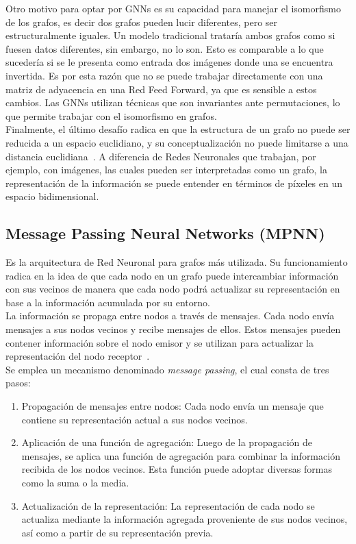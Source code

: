 Otro motivo para optar por GNNs es su capacidad para manejar el isomorfismo de los grafos, es decir dos grafos pueden lucir diferentes, pero ser estructuralmente iguales. Un modelo tradicional trataría ambos grafos como si fuesen datos diferentes, sin embargo, no lo son. Esto es comparable a lo que sucedería si se le presenta como entrada dos imágenes donde una se encuentra invertida. Es por esta razón que no se puede trabajar directamente con una matriz de adyacencia en una Red Feed Forward, ya que es sensible a estos cambios. Las GNNs utilizan técnicas que son invariantes ante permutaciones, lo que permite trabajar con el isomorfismo en grafos.\\

Finalmente, el último desafío radica en que la estructura de un grafo no puede ser reducida a un espacio euclidiano, y su conceptualización no puede limitarse a una distancia euclidiana~\cite{EuclideanGNN}. A diferencia de Redes Neuronales que trabajan, por ejemplo, con imágenes, las cuales pueden ser interpretadas como un grafo, la representación de la información se puede entender en términos de píxeles en un espacio bidimensional. \\



\subsection{Message Passing Neural Networks (MPNN)}
    
Es la arquitectura de Red Neuronal para grafos más utilizada. Su funcionamiento radica en la idea de que cada nodo en un grafo puede intercambiar información con sus vecinos de manera que cada nodo podrá actualizar su representación en base a la información acumulada por su entorno.\\


La información se propaga entre nodos a través de mensajes. Cada nodo envía mensajes a sus nodos vecinos y recibe mensajes de ellos. Estos mensajes pueden contener información sobre el nodo emisor y se utilizan para actualizar la representación del nodo receptor~\cite{mpnn}.\\


Se emplea un mecanismo denominado \textit{message passing}, el cual consta de tres pasos:
\begin{enumerate}
    \item Propagación de mensajes entre nodos: Cada nodo envía un mensaje que contiene su representación actual a sus nodos vecinos.
    \item Aplicación de una función de agregación: Luego de la propagación de mensajes, se aplica una función de agregación para combinar la información recibida de los nodos vecinos.
Esta función puede adoptar diversas formas como la suma o la media.
    \item Actualización de la representación: La representación de cada nodo se actualiza mediante la información agregada proveniente de sus nodos vecinos, así como a partir de su representación previa.
\end{enumerate}

